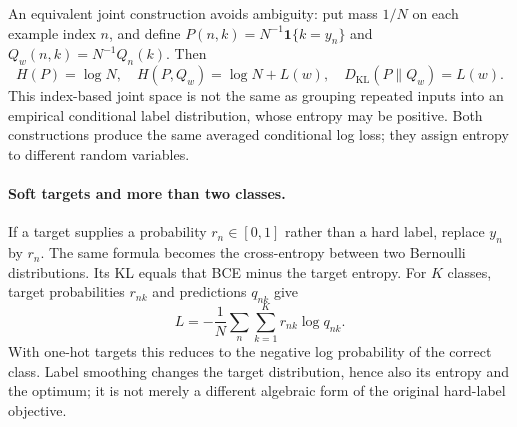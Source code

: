 An equivalent joint construction avoids ambiguity: put mass $1/N$ on each
example index $n$, and define
$P(n,k)=N^{-1}\mathbf1\{k=y_n\}$ and
$Q_w(n,k)=N^{-1}Q_n(k)$. Then
\[
H(P)=\log N,\quad H(P,Q_w)=\log N+L(w),\quad
D_{\mathrm{KL}}(P\|Q_w)=L(w).
\]
This index-based joint space is not the same as grouping repeated inputs into
an empirical conditional label distribution, whose entropy may be positive.
Both constructions produce the same averaged conditional log loss; they assign
entropy to different random variables.

\paragraph{Soft targets and more than two classes.}
If a target supplies a probability $r_n\in[0,1]$ rather than a hard label,
replace $y_n$ by $r_n$. The same formula becomes the cross-entropy between two
Bernoulli distributions. Its KL equals that BCE minus the target entropy.
For $K$ classes, target probabilities $r_{nk}$ and predictions $q_{nk}$ give
\[
L=-\frac1N\sum_n\sum_{k=1}^K r_{nk}\log q_{nk}.
\]
With one-hot targets this reduces to the negative log probability of the correct
class. Label smoothing changes the target distribution, hence also its entropy
and the optimum; it is not merely a different algebraic form of the original
hard-label objective.

